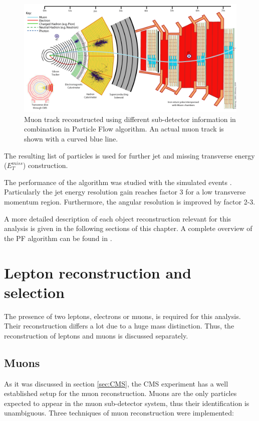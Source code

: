 \begin{figure}[t]
  \centering
  \includegraphics[width=1.0\textwidth]{04_event_reconstruction/plots/CMS_Slice.png}
  \caption{Muon track reconstructed using different sub-detector information in combination in Particle Flow algorithm. An actual
  muon track is shown with a curved blue line.}
  \label{fig:PFmuons}
\end{figure}

The resulting list of particles is used for further jet and missing transverse energy ($E_{T}^{miss}$) construction. 

The performance of the algorithm was studied with the simulated events \cite{CMS-PAS-PFT-09-001}. Particularly the jet energy
resolution gain reaches factor 3 for a low transverse momentum region. Furthermore, the angular resolution is improved by factor 2-3.

A more detailed description of each object reconstruction relevant for this analysis is given in the following sections of this chapter.
A complete overview of the PF algorithm can be found in \cite{CMS-PAS-PFT-09-001}. 

\section{Lepton reconstruction and selection}

The presence of two leptons, electrons or muons, is required for this analysis. Their reconstruction
differs a lot due to a huge mass distinction. Thus, the reconstruction of leptons and muons is discussed separately.

\subsection{Muons}

As it was discussed in section \ref{sec:CMS}, the CMS experiment has a well established setup for the muon reconstruction.
Muons are the only particles expected to appear in the muon sub-detector system, thus their identification is unambiguous.
Three techniques of muon reconstruction were implemented:

